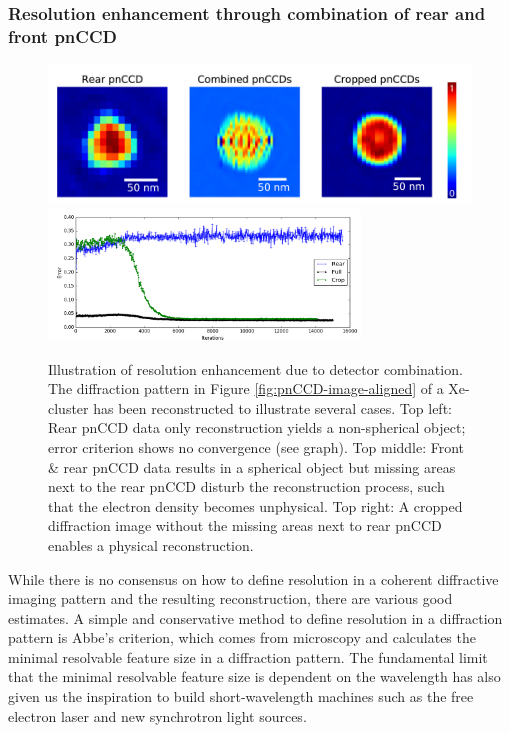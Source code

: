 \subsubsection{Resolution enhancement through combination of rear and front pnCCD}\label{sec:resolution-discussion}
\begin{figure}
  \begin{center}
   \includegraphics[width=0.8\linewidth]{images/Phase-retrieval-image.png}\\
   \includegraphics[height=3.5cm]{images/Phase-retrieval-error.png}
    \caption[Illustration of resolution enhancement and diffraction image cropping.]{Illustration of resolution enhancement due to detector combination. The diffraction pattern in Figure \ref{fig:pnCCD-image-aligned} of a Xe-cluster has been reconstructed to illustrate several cases. Top left: Rear pnCCD data only reconstruction yields a non-spherical object; error criterion shows no convergence (see graph). Top middle: Front \& rear pnCCD data results in a spherical object but missing areas next to the rear pnCCD disturb the reconstruction process, such that the electron density becomes unphysical. Top right: A cropped diffraction image without the missing areas next to rear pnCCD enables a physical reconstruction.}
\label{fig:phase-retrieval-image}
  \end{center}
\end{figure}
While there is no consensus on how to define resolution in a coherent diffractive imaging pattern and the resulting reconstruction, there are various good estimates. A simple and conservative method to define resolution in a diffraction pattern is Abbe's criterion, which comes from microscopy and calculates the minimal resolvable feature size in a diffraction pattern. The fundamental limit that the minimal resolvable feature size is dependent on the wavelength has also given us the inspiration to build short-wavelength machines such as the free electron laser and new synchrotron light sources.\\[1\baselineskip]
